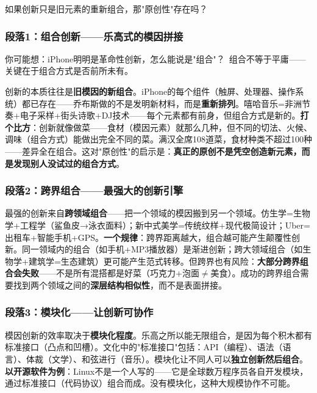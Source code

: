 \documentclass[../main.tex]{subfiles}
\begin{document}
\begin{questionbox}

	如果创新只是旧元素的重新组合，那"原创性"存在吗？

\end{questionbox}

\subsubsection*{段落1：组合创新——乐高式的模因拼接}

\begin{tcolorbox}[colback=yellow!5, title=\textit{读者行为预测}]

	你可能想：iPhone明明是革命性创新，怎么能说是"组合"？\ 组合不等于平庸——关键在于组合方式是否前所未有。

\end{tcolorbox}

创新的本质往往是\textbf{旧模因的新组合}。iPhone的每个组件（触屏、处理器、操作系统）都已存在——乔布斯做的不是发明新材料，而是\textbf{重新排列}。嘻哈音乐=非洲节奏+电子采样+街头诗歌+DJ技术——每个元素都有前身，但组合方式是新的。\textbf{打个比方}：创新就像做菜——食材（模因元素）就那么几种，但不同的切法、火候、调味（组合方式）能做出完全不同的菜。满汉全席108道菜，食材种类不超过100种——差异全在组合。这对"原创性"的启示是：\textbf{真正的原创不是凭空创造新元素，而是发现别人没试过的组合方式}。

\subsubsection*{段落2：跨界组合——最强大的创新引擎}

最强的创新来自\textbf{跨领域组合}——把一个领域的模因搬到另一个领域。仿生学=生物学+工程学（鲨鱼皮→泳衣面料）；新中式美学=传统纹样+现代极简设计；Uber=出租车+智能手机+GPS。\textbf{一个规律}：跨界距离越大，组合越可能产生颠覆性创新。同一领域内的组合（如手机+MP3播放器）是渐进创新；跨大领域组合（如生物学+建筑学=生态建筑）更可能产生范式转移。但跨界也有风险：\textbf{大部分跨界组合会失败}——不是所有混搭都是好菜（巧克力+泡面$\neq$美食）。成功的跨界组合需要找到两个领域之间的\textbf{深层结构相似性}，而不是表面拼接。

\subsubsection*{段落3：模块化——让创新可协作}

模因创新的效率取决于\textbf{模块化程度}。乐高之所以能无限组合，是因为每个积木都有标准接口（凸点和凹槽）。文化中的"标准接口"包括：API（编程）、语法（语言）、体裁（文学）、和弦进行（音乐）。模块化让不同人可以\textbf{独立创新然后组合}。\textbf{以开源软件为例}：Linux不是一个人写的——它是全球数万程序员各自开发模块，通过标准接口（代码协议）组合而成。没有模块化，这种大规模协作不可能。
\end{document}
